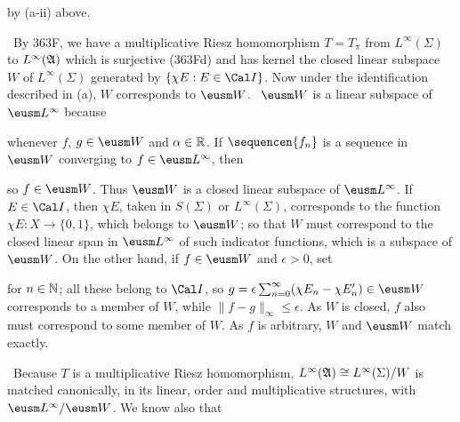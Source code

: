 {\noindent by (a-ii) above.

\medskip

\grheada\ 
By 363F, we have a multiplicative Riesz homomorphism
$T=T_{\pi}$ from $L^{\infty}(\Sigma)$ to $L^{\infty}(\frak A)$ which is
surjective (363Fd) and has kernel the closed linear subspace $W$ of
$L^{\infty}(\Sigma)$ generated by $\{\chi E:E\in\Cal I\}$.   Now under
the identification described in (a), $W$ corresponds to $\eusm W$.   \Prf\
$\eusm W$ is a linear subspace of $\eusm L^{\infty}$ because



\noindent whenever $f$, $g\in\eusm W$ and $\alpha\in\Bbb R$.   
If $\sequencen{f_n}$ is a sequence in $\eusm W$ converging to
$f\in\eusm L^{\infty}$, then


\noindent so $f\in\eusm W$.   Thus $\eusm W$ is a closed linear subspace
of $\eusm L^{\infty}$.   If $E\in\Cal I$, then $\chi E$,
taken in $S(\Sigma)$ or $L^{\infty}(\Sigma)$, corresponds to the
function $\chi E:X\to\{0,1\}$, which belongs to $\eusm W$;  so that $W$
must correspond to the closed linear span in $\eusm L^{\infty}$ of such
indicator functions, which is a subspace of $\eusm W$.   
On the other hand, if $f\in\eusm W$ and $\epsilon>0$, set


\noindent for $n\in\Bbb N$;  all these belong to $\Cal I$, so
$g=\epsilon\sum_{n=0}^{\infty}(\chi E_n-\chi E'_n)\in\eusm W$ 
corresponds to a
member of $W$, while $\|f-g\|_{\infty}\le\epsilon$.   As $W$ is closed,
$f$ also must correspond to some member of $W$.   As $f$ is arbitrary,
$W$ and $\eusm W$ match exactly.\ \Qed

\medskip

\qquad\grheadb\ Because $T$ is a multiplicative Riesz homomorphism,
$L^{\infty}(\frak A)\cong L^{\infty}(\Sigma)/W$
is matched canonically, in its linear, order
and multiplicative structures, with $\eusm L^{\infty}/\eusm W$.   We
know also that


}
